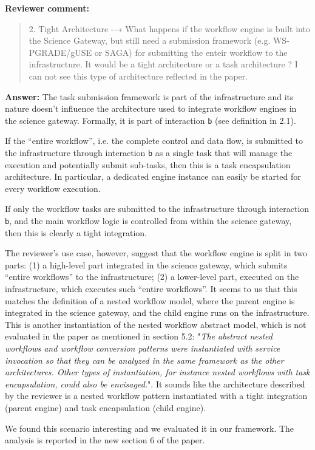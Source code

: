 \documentclass[a4]{article}
\newenvironment{review}%
{\textbf{Reviewer comment:}\begin{quote}}%
{\end{quote}}%
\newcommand{\answer}[1]{\textbf{Answer:} #1}
\begin{document}
\begin{review}
  2. Tight Architecture -→ What happens if the workflow engine is
  built into the Science Gateway, but still need a submission
  framework (e.g. WS-PGRADE/gUSE or SAGA) for submitting the enteir
  workflow to the infrastructure.  It would be a tight architecture or
  a task architecture ? I can not see this type of architecture
  reflected in the paper.
\end{review}

\answer{The task submission framework is part of the infrastructure
  and its nature doesn't influence the architecture used to integrate
  workflow engines in the science gateway. Formally, it is part of
  interaction \texttt{b} (see definition in 2.1).

  If the ``entire workflow'', i.e. the complete control and data flow,
  is submitted to the infrastructure through interaction \texttt{b} as
  a single task that will manage the execution and potentially submit
  sub-tasks, then this is a task encapsulation architecture. In
  particular, a dedicated engine instance can easily be started for
  every workflow execution.

  If only the workflow tasks are submitted to the infrastructure
  through interaction \texttt{b}, and the main workflow logic is
  controlled from within the science gateway, then this is clearly a
  tight integration.

  The reviewer's use case, however, suggest that the workflow engine
  is split in two parts: (1) a high-level part integrated in the
  science gateway, which submits ``entire workflows'' to the
  infrastructure; (2) a lower-level part, executed on the
  infrastructure, which executes such ``entire workflows''. It seems
  to us that this matches the definition of a nested workflow model,
  where the parent engine is integrated in the science gateway, and
  the child engine runs on the infrastructure. This is another
  instantiation of the nested workflow abstract model, which is not
  evaluated in the paper as mentioned in section 5.2: "\emph{The
    abstract nested workflows and workflow conversion patterns were
    instantiated with service invocation so that they can be analyzed
    in the same framework as the other architectures. Other types of
    instantiation, for instance nested workflows with task
    encapsulation, could also be envisaged.}". It sounds like the
  architecture described by the reviewer is a nested workflow pattern
  instantiated with a tight integration (parent engine) and task
  encapsulation (child engine).

  We found this scenario interesting and we evaluated it in our
  framework. The analysis is reported in the new section 6 of the
  paper.}
\end{document}

